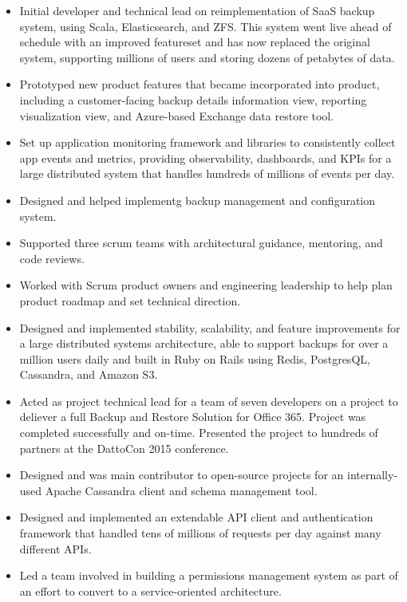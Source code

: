 \documentclass[11pt,a4paper,sans]{moderncv}
\begin{document}
{ \begin{itemize} \itemsep -1pt
  \item Initial developer and technical lead on reimplementation of SaaS backup system, using Scala, Elasticsearch, and ZFS.
    This system went live ahead of schedule with an improved featureset and has now replaced the original system, supporting millions of users and storing dozens of petabytes of data.
  \item Prototyped new product features that became incorporated into product, including a customer-facing backup details information view, reporting visualization view, and Azure-based Exchange data restore tool.
  \item Set up application monitoring framework and libraries to consistently collect app events and metrics, providing observability, dashboards, and KPIs for a large distributed system that handles hundreds of millions of events per day.
  \item Designed and helped implementg backup management and configuration system.
  \item Supported three scrum teams with architectural guidance, mentoring, and code reviews.
  \item Worked with Scrum product owners and engineering leadership to help plan product roadmap and set technical direction.
 \end{itemize} }

{ \begin{itemize} \itemsep -1pt
  \item Designed and implemented stability, scalability, and feature improvements for a large distributed systems architecture, able to support backups for over a million users daily and built in Ruby on Rails using Redis, PostgresQL, Cassandra, and Amazon S3.
  \item Acted as project technical lead for a team of seven developers on a project to deliever a full Backup and Restore Solution for Office 365. Project was completed successfully and on-time. Presented the project to hundreds of partners at the DattoCon 2015 conference.
  \item Designed and was main contributor to open-source projects for an internally-used Apache Cassandra client and schema management tool.
  \item Designed and implemented an extendable API client and authentication framework that handled tens of millions of requests per day against many different APIs.
  \item Led a team involved in building a permissions management system as part of an effort to convert to a service-oriented architecture.
\end{itemize} }
\end{document}
